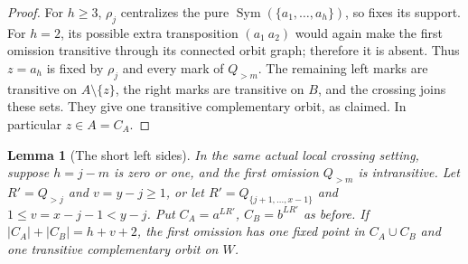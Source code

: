 \documentclass[11pt,a4paper]{article}
\newtheorem{lemma}{Lemma}
\newcommand{\Sym}{\operatorname{Sym}}
\begin{document}
\begin{proof}
For $h\ge3$, $\rho_j$ centralizes the pure
$\Sym(\{a_1,\ldots,a_h\})$, so fixes its support.
For $h=2$, its possible extra transposition
$(a_1\ a_2)$ would again make the first omission
transitive through its connected orbit graph;
therefore it is absent. Thus $z=a_h$ is fixed
by $\rho_j$ and every mark of $Q_{>m}$.
The remaining left marks are transitive on
$A\setminus\{z\}$, the right marks are transitive
on $B$, and the crossing joins these sets.
They give one transitive complementary orbit,
as claimed. In particular $z\in A=C_A$.
\end{proof}

\begin{lemma}[The short left sides]
In the same actual local crossing setting, suppose
$h=j-m$ is zero or one, and the first omission
$Q_{>m}$ is intransitive. Let $R'=Q_{>j}$ and
$v=y-j\ge1$, or let
$R'=Q_{\{j+1,\ldots,x-1\}}$ and
$1\le v=x-j-1<y-j$. Put
$C_A=a^{LR'}$, $C_B=b^{LR'}$ as before.
If $|C_A|+|C_B|=h+v+2$, the first omission has
one fixed point in $C_A\cup C_B$ and one
transitive complementary orbit on $W$.
\end{lemma}
\end{document}
